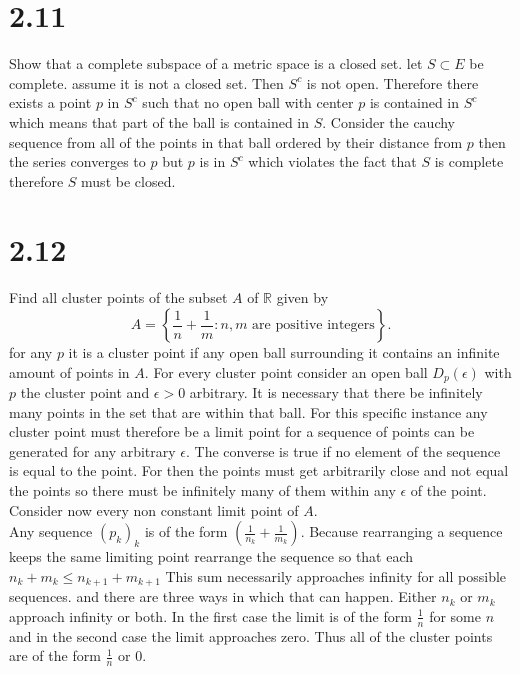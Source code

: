 \documentclass{article}
\begin{document}
    \section {2.11}
    Show that a complete subspace of a metric space is a closed set. 
    let  $S \subset E$ be complete. assume it is not a closed set. Then $S^{c}$ is not open. Therefore there exists a point
     $p$ in $S^{c}$ such that no open ball with center $p$ is contained in $S^{c}$ which means that part of the ball is contained in $S$.
     Consider the cauchy sequence from all of the points in that ball ordered by their distance from $p$ then the series converges to $p$ but $p$ is in $S^{c}$ which
     violates the fact that $S$ is complete therefore $S$ must be closed.
     \section {2.12}
     Find all cluster points of the subset $A$ of $ \mathbb{R} $ given by
     \[
         A = \left\{ \frac{1}{n} + \frac{1}{m}: n,m \text{ are positive integers} \right\}
     .\] 
     for any $p$ it is a cluster point if any open ball surrounding it contains an infinite amount of points in $A$.
     For every cluster point consider an open ball $D_p(\epsilon )$ with $p$ the cluster point and $\epsilon >0$ arbitrary. It is necessary that there be infinitely many points in the set that are within that ball.
     For this specific instance any cluster point must therefore be a limit point for a sequence of points can be generated for any arbitrary $\epsilon $. The converse is true if no element of the sequence is equal to the point. For then the points must get arbitrarily close and not equal the points so there must be infinitely many of them
     within any $\epsilon $ of the point.
     \\
     Consider now every non constant limit point of $A$.\\
     Any sequence $(p_k)_k$ is of the form $(\frac{1}{n_k} + \frac{1}{m_k})$. Because rearranging a sequence keeps the same limiting point rearrange the sequence so that each $n_k + m_k \le n_{k+1} + m_{k+1}$
     This sum necessarily approaches infinity for all possible sequences. and there are three ways in which that can happen. Either $n_k$ or $m_k$ approach infinity or both. In the first case the limit is of the form
     $\frac{1}{n}$ for some $n$ and in the second case the limit approaches zero.
     Thus all of the cluster points are of the form $\frac{1}{n}$ or $0$.
\end{document}
